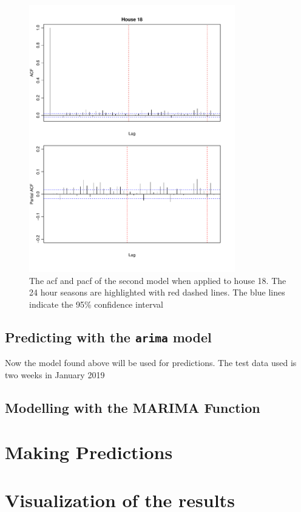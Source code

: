 \begin{figure}
    \centering
    \includegraphics[width=0.8\textwidth]{../../../figures/arimax/ACF_18_short.pdf}
    \caption{The acf and pacf of the second model when applied to house 18. The 24 hour seasons are highlighted with red dashed lines. The blue lines indicate the 95\% confidence interval}
    \label{fig:Model2_acf_18}
\end{figure}    


\subsection{Predicting with the \texttt{arima} model}
Now the model found above will be used for predictions. The test data used is two weeks in January 2019




\subsection{Modelling with the MARIMA Function}




\section{Making Predictions}

\section{Visualization of the results} 

